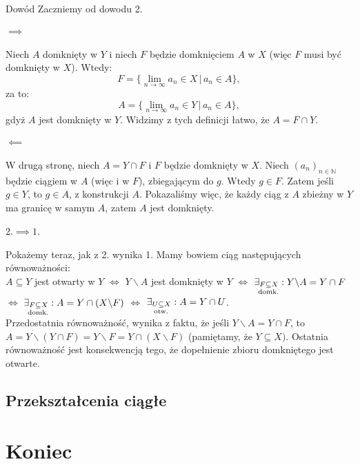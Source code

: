 \documentclass{article}
\newcommand{\N}{\mathbb{N}}
\newcommand{\oo}{\infty}
\newcommand{\subotw}{\underset{\clap{\scriptsize otw.}}{\subseteq}}
\newcommand{\subdomk}{\underset{\clap{\scriptsize domk.}}{\subseteq}}
\newcommand{\ciag}[1]{(#1_{n})_{n \in \N}}
\begin{document}
    \begin{dow}{Dowód}
        Zaczniemy od dowodu 2.
        \paragraph{$\implies$} Niech $A$ domknięty w $Y$ i niech $F$ będzie domknięciem $A$ w $X$ (więc $F$ musi być domknięty w $X$). Wtedy: \begin{equation*}
            F = \{ \lim_{n \to \oo} a_n \in X \, \big| \, a_n \in A \},
        \end{equation*} za to:\begin{equation*}
            A = \{ \lim_{n \to \oo} a_n \in Y \, \big| \, a_n \in A \},
        \end{equation*}gdyż $A$ jest domknięty w $Y$. Widzimy z tych definicji łatwo, że $A = F \cap Y$.
        \paragraph{$\impliedby$} W drugą stronę, niech $A = Y \cap F$ i $F$ będzie domknięty w $X$. Niech $\ciag{a}$ będzie ciągiem w $A$ (więc i w $F$), zbiegającym do $g$. Wtedy $g \in F$. Zatem jeśli $g \in Y$, to $g \in A$, z konstrukcji $A$. Pokazaliśmy więc, że każdy ciąg z $A$ zbieżny w $Y$ ma granicę w samym $A$, zatem $A$ jest domknięty.
        \paragraph{$2. \implies 1.$} Pokażemy teraz, jak z 2. wynika 1. Mamy bowiem ciąg następujących równoważności: \\
        $A \subseteq Y$ jest otwarty w $Y$ $\iff$ $Y \backslash A$ jest domknięty w $Y$ $\iff$ $\exists_{F \subdomk X}: Y \backslash A = Y \cap F$ $\iff$ $ \exists_{F \subdomk X}: A = Y \cap (X \backslash F)$ $\iff$ $\exists_{U \subotw X}: A = Y \cap U$.\\
        Przedostatnia równoważność, wynika z faktu, że jeśli $Y \backslash A = Y \cap F$, to $A = Y \backslash (Y \cap F) = Y \backslash F =Y \cap (X \backslash F)$ (pamiętamy, że $Y\subseteq X)$.
        Ostatnia równoważność jest konsekwencją tego, że dopełnienie zbioru domkniętego jest otwarte.
    \end{dow}

\subsection{Przekształcenia ciągłe}



\section*{Koniec}
\tableofcontents
\end{document}
